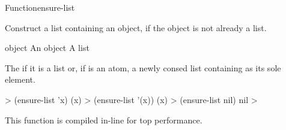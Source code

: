 \documentclass[10pt,twoside,english,pdftex]{article}
\newcommand{\inline}{This function is compiled in-line for top performance.}
\begin{document}

\begin{functiondoc}{Function}{ensure-list}{ 
    }
%

\fnsyntax

\fnpurpose Construct a list containing an object, if the object is not
already a list.

\fnpackage {}

\fnmodule {}

\fnargs
\begin{args}{object}
\arg[object] An object
\arg[list] A list
\end{args}

\fnreturns The  if it is a list or, if  is
an atom, a newly consed list containing  as its sole element.
  
\fnexamples
%
\W\supp
\begin{example}
  > (ensure-list 'x)
  (x)
  > (ensure-list '(x))
  (x)
  > (ensure-list nil)
  nil
  >
\end{example}

\fnnote \inline

\end{functiondoc}

\end{document}
